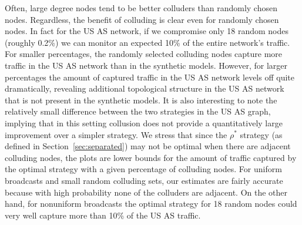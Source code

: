 \documentclass{comnet}
\begin{document}
Often, large degree nodes tend to be better colluders than randomly chosen
nodes. Regardless, the benefit of colluding is clear even for randomly chosen
nodes. In fact for the US AS network, if we compromise only 18 random nodes
(roughly 0.2\%) we can monitor an expected 10\% of the entire network's
traffic. For smaller percentages, the randomly selected colluding nodes capture
more traffic in the US AS network than in the synthetic models. However, for
larger percentages the amount of captured traffic in the US AS network levels
off quite dramatically, revealing additional topological structure in the US AS
network that is not present in the synthetic models. It is also interesting to
note the relatively small difference between the two strategies in the US AS
graph, implying that in this setting collusion does not provide a
quantitatively large improvement over a simpler strategy. We stress that since
the $\rho^*$ strategy (as defined in Section~\ref{sec:separated}) may not be
optimal when there are adjacent colluding nodes, the plots are lower bounds for
the amount of traffic captured by the optimal strategy with a given percentage
of colluding nodes. For uniform broadcasts and small random colluding sets, our
estimates are fairly accurate because with high probability none of the
colluders are adjacent. On the other hand, for nonuniform broadcasts the
optimal strategy for 18 random nodes could very well capture more than 10\% of
the US AS traffic.
\end{document}
